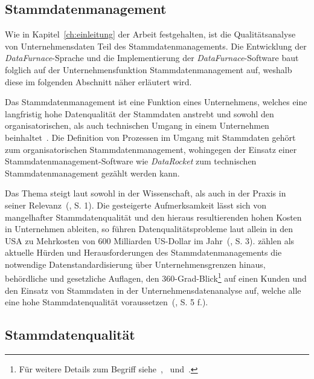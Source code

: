\documentclass[
  language=german, %
  type=bachelor,%
  ngerman
]{isthesis}
\begin{document}
\begin{content}
  \section{Stammdatenmanagement}\label{sec:stammdatenmanagement}

  Wie in Kapitel~\ref{ch:einleitung} der Arbeit festgehalten, ist die
  Qualitätsanalyse von Unternehmensdaten Teil des Stammdatenmanagements. Die
  Entwicklung der \textit{DataFurnace}-Sprache und die Implementierung der
  \textit{DataFurnace}-Software baut folglich auf der Unternehmensfunktion
  Stammdatenmanagement auf, weshalb diese im folgenden Abschnitt näher
  erläutert wird.

	Das Stammdatenmanagement ist eine Funktion eines Unternehmens, welches eine
	langfristig hohe Datenqualität der Stammdaten anstrebt und sowohl den
	organisatorischen, als auch technischen Umgang in einem Unternehmen
	beinhaltet~\cite[][S.  2]{legner2007stammdaten}.  Die Definition von
	Prozessen im Umgang mit Stammdaten gehört \zB{} zum organisatorischen
	Stammdatenmanagement, wohingegen der Einsatz einer Stammdatenmanagement-Software
	wie \textit{DataRocket} zum technischen Stammdatenmanagement gezählt werden
	kann.  

  Das Thema steigt laut \textsc{\citeauthor{otto2012design}} sowohl in der
  Wissenschaft, als auch in der Praxis in seiner
  Relevanz~(\citeyear{otto2012design}, S. 1). Die gesteigerte Aufmerksamkeit
  lässt sich von mangelhafter Stammdatenqualität und den hieraus resultierenden
  hohen Kosten in Unternehmen ableiten, so führen Datenqualitätsprobleme
  laut \textsc{\citeauthor{eckerson2002data}} allein in den USA zu Mehrkosten
  von 600 Milliarden US-Dollar im Jahr~(\citeyear{eckerson2002data}, S.
  3).  \textsc{\citeauthor{otto2011stammdatenmanagement}} zählen als aktuelle
  Hürden und Herausforderungen des Stammdatenmanagements die notwendige
  Datenstandardisierung über Unternehmensgrenzen hinaus, behördliche und
  gesetzliche Auflagen, den 360-Grad-Blick\footnote{Für weitere Details zum
  Begriff siehe~\cite{kotorov2003customer},~\cite{otto2016datenqualitat}
  und~\cite{otto2016master}.} auf einen Kunden und den Einsatz von Stammdaten in
  der Unternehmensdatenanalyse auf, welche alle eine hohe Stammdatenqualität
  voraussetzen~(\citeyear{otto2011stammdatenmanagement}, S. 5 f.).
	

	\subsection{Stammdatenqualität}\label{subsec:stammdatenqualität}
	

\end{content}
\end{document}
